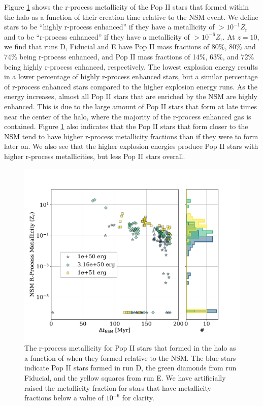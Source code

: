\documentclass[fleqn,usenatbib]{mnras}
\begin{document}
Figure \ref{fig:eng_NSM_deltat} shows the r-process metallicity of the Pop II stars that formed within the halo as a function of their creation time relative to the NSM event. We define stars to be ``highly r-process enhanced'' if they have a metallicity of $> 10^{-1} Z_{\mathrm{r}}$ and to be ``r-process enhanced'' if they have a metallicity of $> 10^{-6} Z_{\mathrm{r}}$. At $z = 10$, we find that runs D, Fiducial and E have Pop II mass fractions of 80\%, 80\% and 74\% being r-process enhanced, and Pop II mass fractions of 14\%, 63\%, and 72\% being highly r-process enhanced, respectively. The lowest explosion energy results in a lower percentage of highly r-process enhanced stars, but a similar percentage of r-process enhanced stars compared to the higher explosion energy runs. As the energy increases, almost all Pop II stars that are enriched by the NSM are highly enhanced. This is due to the large amount of Pop II stars that form at late times near the center of the halo, where the majority of the r-process enhanced gas is contained. Figure \ref{fig:eng_NSM_deltat} also indicates that the Pop II stars that form closer to the NSM tend to have higher r-process metallicity fractions than if they were to form later on. We also see that the higher explosion energies produce Pop II stars with higher r-process metallicities, but less Pop II stars overall. 

\begin{figure} 
	\includegraphics[width=\columnwidth]{plots/eng_NSM_deltat.pdf}
	\caption[R-process metallicity as a function of $\Delta t_{\mathrm{NSM}}$ for the energy variation runs.]{The r-process metallicity for Pop II stars that formed in the halo as a function of when they formed relative to the NSM. The blue stars indicate Pop II stars formed in run D, the green diamonds from run Fiducial, and the yellow squares from run E. We have artificially raised the metallicity fraction for stars that have metallicity fractions below a value of $10^{-6}$ for clarity.}
	\label{fig:eng_NSM_deltat}
\end{figure}
\end{document}

